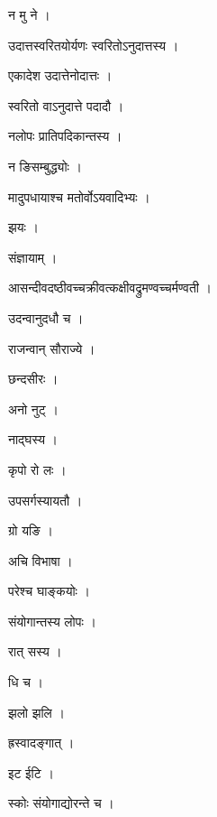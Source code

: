 \documentclass[10pt, openany]{book}
\begin{document}
\noindent न मु ने ।

\noindent उदात्तस्वरितयोर्यणः स्वरितोऽनुदात्तस्य ।

\noindent एकादेश उदात्तेनोदात्तः ।

\noindent स्वरितो वाऽनुदात्ते पदादौ ।

\noindent नलोपः प्रातिपदिकान्तस्य ।

\noindent न ङिसम्बुद्ध्योः ।

\noindent मादुपधायाश्च मतोर्वोऽयवादिभ्यः ।

\noindent झयः ।

\noindent संज्ञायाम् ।

\noindent आसन्दीवदष्ठीवच्चक्रीवत्कक्षीवद्रुमण्वच्चर्मण्वती ।

\noindent उदन्वानुदधौ च ।

\noindent राजन्वान् सौराज्ये ।

\noindent छन्दसीरः ।

\noindent अनो नुट् ।

\noindent नाद्घस्य ।

\noindent कृपो रो लः ।

\noindent उपसर्गस्यायतौ ।

\noindent ग्रो यङि ।

\noindent अचि विभाषा ।

\noindent परेश्च घाङ्कयोः ।

\noindent संयोगान्तस्य लोपः ।

\noindent रात् सस्य ।

\noindent धि च ।

\noindent झलो झलि ।

\noindent ह्रस्वादङ्गात् ।

\noindent इट ईटि ।

\noindent स्कोः संयोगाद्योरन्ते च ।
\end{document}
